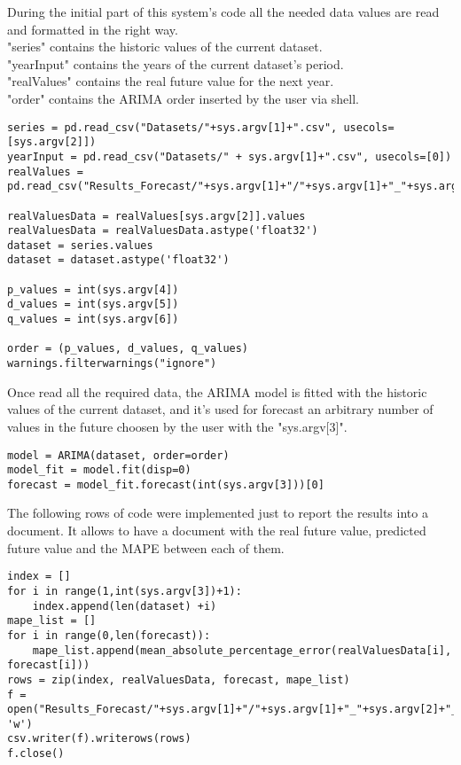 During the initial part of this system's code all the needed data values are read and formatted in the right way. \\
"series" contains the historic values of the current dataset.\\
"yearInput" contains the years of the current dataset's period.\\
"realValues" contains the real future value for the next year. \\
"order" contains the ARIMA order inserted by the user via shell.
\begin{lstlisting}
series = pd.read_csv("Datasets/"+sys.argv[1]+".csv", usecols=[sys.argv[2]])
yearInput = pd.read_csv("Datasets/" + sys.argv[1]+".csv", usecols=[0])
realValues = pd.read_csv("Results_Forecast/"+sys.argv[1]+"/"+sys.argv[1]+"_"+sys.argv[2]+"_2015.csv")

realValuesData = realValues[sys.argv[2]].values
realValuesData = realValuesData.astype('float32')
dataset = series.values
dataset = dataset.astype('float32')

p_values = int(sys.argv[4])
d_values = int(sys.argv[5])
q_values = int(sys.argv[6])

order = (p_values, d_values, q_values)
warnings.filterwarnings("ignore")
\end{lstlisting}

Once read all the required data, the ARIMA model is fitted with the historic values of the current dataset, and it's used for forecast an arbitrary number of values in the future choosen by the user with the "sys.argv[3]".
\begin{lstlisting}
model = ARIMA(dataset, order=order)
model_fit = model.fit(disp=0)
forecast = model_fit.forecast(int(sys.argv[3]))[0]
\end{lstlisting}


The following rows of code were implemented just to report the results into a document.
It allows to have a document with the real future value, predicted future value and the MAPE between each of them.
\begin{lstlisting}
index = []
for i in range(1,int(sys.argv[3])+1):
	index.append(len(dataset) +i)
mape_list = []
for i in range(0,len(forecast)):
	mape_list.append(mean_absolute_percentage_error(realValuesData[i], forecast[i]))	
rows = zip(index, realValuesData, forecast, mape_list)
f = open("Results_Forecast/"+sys.argv[1]+"/"+sys.argv[1]+"_"+sys.argv[2]+"_futurePred.csv", 'w')
csv.writer(f).writerows(rows)
f.close()
\end{lstlisting}

